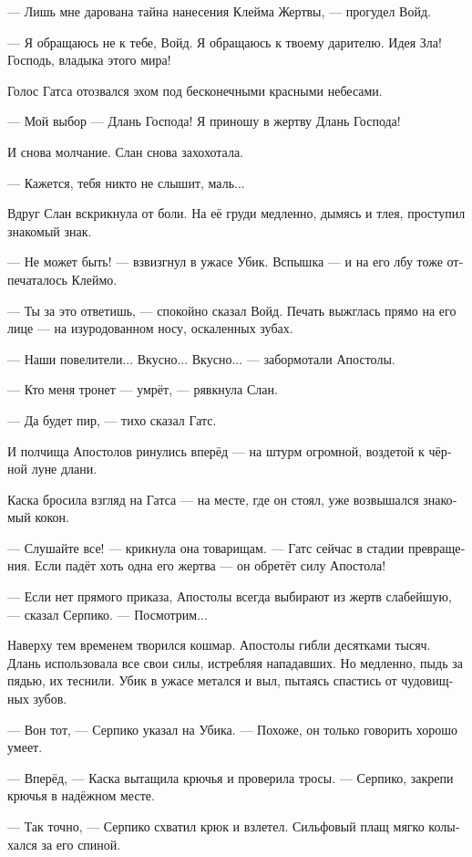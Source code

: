\documentclass[a4paper,12pt,fleqn]{book}\usepackage{polyglossia}\setdefaultlanguage[babelshorthands=true]{russian}\setotherlanguage{english}\defaultfontfeatures{Ligatures=TeX,Mapping=tex-text}\usepackage{xcolor}\newcommand{\ml}[3]{#2}
\begin{document}
--- Лишь мне дарована тайна нанесения Клейма Жертвы, --- прогудел Войд.

--- Я обращаюсь не к тебе, Войд.
Я обращаюсь к твоему дарителю.
Идея Зла!
Господь, владыка этого мира!

Голос Гатса отозвался эхом под бесконечными красными небесами.

--- Мой выбор --- Длань Господа!
Я приношу в жертву Длань Господа!

И снова молчание.
Слан снова захохотала.

--- Кажется, тебя никто не слышит, маль...

Вдруг Слан вскрикнула от боли.
На её груди медленно, дымясь и тлея, проступил знакомый знак.

--- Не может быть! --- взвизгнул в ужасе Убик.
Вспышка --- и на его лбу тоже отпечаталось Клеймо.

--- Ты за это ответишь, --- спокойно сказал Войд.
Печать выжглась прямо на его лице --- на изуродованном носу, оскаленных зубах.

--- Наши повелители...
Вкусно...
Вкусно... --- забормотали Апостолы.

--- Кто меня тронет --- умрёт, --- рявкнула Слан.

--- Да будет пир, --- тихо сказал Гатс.

И полчища Апостолов ринулись вперёд --- на штурм огромной, воздетой к чёрной луне длани.

Каска бросила взгляд на Гатса --- на месте, где он стоял, уже возвышался знакомый кокон.

--- Слушайте все! --- крикнула она товарищам.
--- Гатс сейчас в стадии превращения.
Если падёт хоть одна его жертва --- он обретёт силу Апостола!

--- Если нет прямого приказа, Апостолы всегда выбирают из жертв слабейшую, --- сказал Серпико.
--- Посмотрим...

Наверху тем временем творился кошмар.
Апостолы гибли десятками тысяч.
Длань использовала все свои силы, истребляя нападавших.
Но медленно, пыдь за пядью, их теснили.
Убик в ужасе метался и выл, пытаясь спастись от чудовищных зубов.

--- Вон тот, --- Серпико указал на Убика.
--- Похоже, он только говорить хорошо умеет.

--- Вперёд, --- Каска вытащила крючья и проверила тросы.
--- Серпико, закрепи крючья в надёжном месте.

--- Так точно, --- Серпико схватил крюк и взлетел.
Сильфовый плащ мягко колыхался за его спиной.
\end{document}
